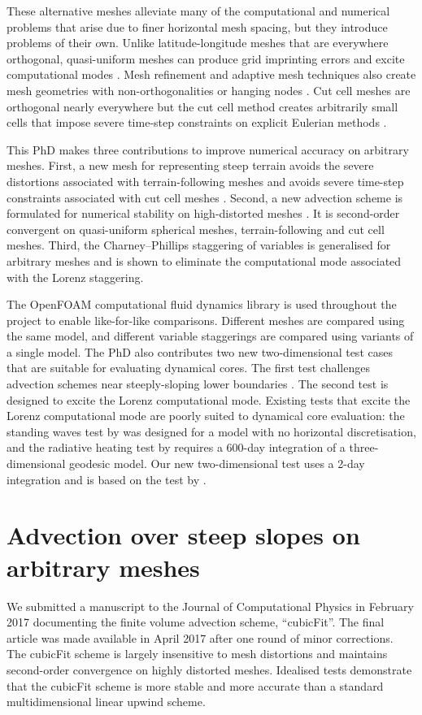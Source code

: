 \documentclass[a4paper,11pt]{article}
\begin{document}
These alternative meshes alleviate many of the computational and numerical problems that arise due to finer horizontal mesh spacing, but they introduce problems of their own.
Unlike latitude-longitude meshes that are everywhere orthogonal, quasi-uniform meshes can produce grid imprinting errors and excite computational modes \citep{weller2012}.
Mesh refinement and adaptive mesh techniques also create mesh geometries with non-orthogonalities or hanging nodes \citep{marras2016}.
Cut cell meshes are orthogonal nearly everywhere but the cut cell method creates arbitrarily small cells that impose severe time-step constraints on explicit Eulerian methods \citep{klein2009}.

This PhD makes three contributions to improve numerical accuracy on arbitrary meshes.  First, a new mesh for representing steep terrain avoids the severe distortions associated with terrain-following meshes and avoids severe time-step constraints associated with cut cell meshes \citep{shaw-weller2016}.  Second, a new advection scheme is formulated for numerical stability on high-distorted meshes \citep{shaw2017}.  It is second-order convergent on quasi-uniform spherical meshes, terrain-following and cut cell meshes.
Third, the Charney--Phillips staggering of variables is generalised for arbitrary meshes and is shown to eliminate the computational mode associated with the Lorenz staggering.

The OpenFOAM computational fluid dynamics library is used throughout the project to enable like-for-like comparisons.  Different meshes are compared using the same model, and different variable staggerings are compared using variants of a single model.
The PhD also contributes two new two-dimensional test cases that are suitable for evaluating dynamical cores.  The first test challenges advection schemes near steeply-sloping lower boundaries \citep{shaw2017}.
The second test is designed to excite the Lorenz computational mode.  Existing tests that excite the Lorenz computational mode are poorly suited to dynamical core evaluation: the standing waves test by \citet{arakawa-konor1996} was designed for a model with no horizontal discretisation, and the radiative heating test by \cite{untch-hortal2004} requires a 600-day integration of a three-dimensional geodesic model.  Our new two-dimensional test uses a 2-day integration and is based on the test by \citet{arakawa-konor1996}.


\section{Advection over steep slopes on arbitrary meshes}
We submitted a manuscript to the Journal of Computational Physics in February 2017 documenting the finite volume advection scheme, ``cubicFit''.  The final article \citep{shaw2017} was made available in April 2017 after one round of minor corrections.  The cubicFit scheme is largely insensitive to mesh distortions and maintains second-order convergence on highly distorted meshes.  Idealised tests demonstrate that the cubicFit scheme is more stable and more accurate than a standard multidimensional linear upwind scheme.
\end{document}
